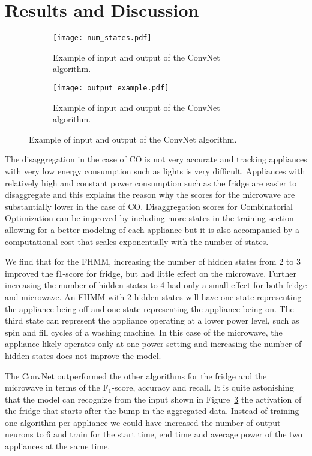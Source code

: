 \documentclass[10pt]{article}
\begin{document}
\section{Results and Discussion}

\begin{figure}[!ht]
\centering
\begin{subfigure}[b]{0.5\linewidth}
\texttt{[image: num\_states.pdf]}
\caption{Example of input and output of the ConvNet algorithm.}
\label{fig:FHMM_states}
\end{subfigure}%
\quad
\begin{subfigure}[b]{0.45\linewidth}
\texttt{[image: output\_example.pdf]}
\caption{Example of input and output of the ConvNet algorithm.}
\label{fig:convnet_result}
\end{subfigure}%
\end{figure}


The disaggregation in the case of CO is not very accurate and tracking appliances with very low energy consumption such as lights is very difficult. Appliances with relatively high and constant power consumption such as the fridge are easier to disaggregate and this explains the reason why the scores for the microwave are substantially lower in the case of CO. Disaggregation scores for Combinatorial Optimization can be improved by including more states in the training section allowing for a better modeling of each appliance but it is also accompanied by a computational cost that scales exponentially with the number of states.

We find that for the FHMM, increasing the number of hidden states from 2 to 3 improved the f1-score for fridge, but had little effect on the microwave. Further increasing the number of hidden states to 4 had only a small effect for both fridge and microwave. An FHMM with 2 hidden states will have one state representing the appliance being off and one state representing the appliance being on. The third state can represent the appliance operating at a lower power level, such as spin and fill cycles of a washing machine. In this case of the microwave, the appliance likely operates only at one power setting and increasing the number of hidden states does not improve the model.

The ConvNet outperformed the other algorithms for the fridge and the microwave in terms of the F$_1$-score, accuracy and recall. It is quite astonishing that the model can recognize from the input shown in Figure~\ref{fig:convnet_result} the activation of the fridge that starts after the bump in the aggregated data. Instead of training one algorithm per appliance we could have increased the number of output neurons to 6 and train for the start time, end time and average power of the two appliances at the same time.
\end{document}
